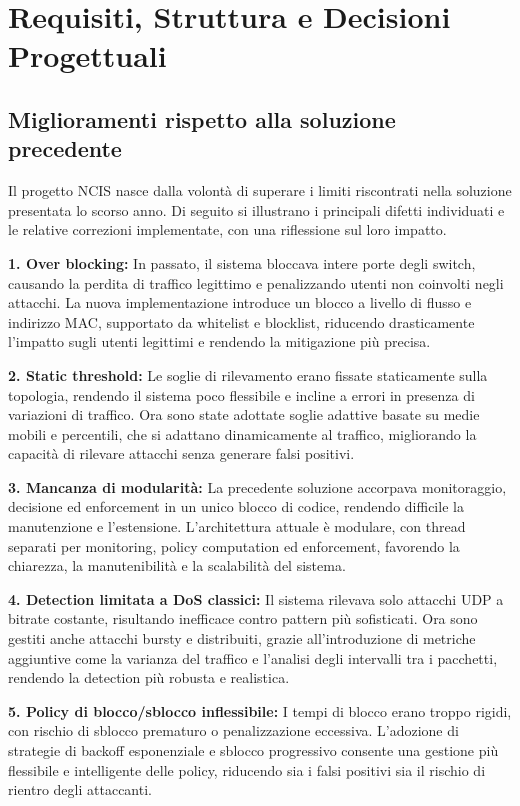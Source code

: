 \chapter{Requisiti, Struttura e Decisioni Progettuali}

\section{Miglioramenti rispetto alla soluzione precedente}
Il progetto NCIS nasce dalla volontà di superare i limiti riscontrati nella soluzione presentata lo scorso anno. Di seguito si illustrano i principali difetti individuati e le relative correzioni implementate, con una riflessione sul loro impatto.

\textbf{1. Over blocking:} In passato, il sistema bloccava intere porte degli switch, causando la perdita di traffico legittimo e penalizzando utenti non coinvolti negli attacchi. La nuova implementazione introduce un blocco a livello di flusso e indirizzo MAC, supportato da whitelist e blocklist, riducendo drasticamente l’impatto sugli utenti legittimi e rendendo la mitigazione più precisa.

\textbf{2. Static threshold:} Le soglie di rilevamento erano fissate staticamente sulla topologia, rendendo il sistema poco flessibile e incline a errori in presenza di variazioni di traffico. Ora sono state adottate soglie adattive basate su medie mobili e percentili, che si adattano dinamicamente al traffico, migliorando la capacità di rilevare attacchi senza generare falsi positivi.

\textbf{3. Mancanza di modularità:} La precedente soluzione accorpava monitoraggio, decisione ed enforcement in un unico blocco di codice, rendendo difficile la manutenzione e l’estensione. L’architettura attuale è modulare, con thread separati per monitoring, policy computation ed enforcement, favorendo la chiarezza, la manutenibilità e la scalabilità del sistema.

\textbf{4. Detection limitata a DoS classici:} Il sistema rilevava solo attacchi UDP a bitrate costante, risultando inefficace contro pattern più sofisticati. Ora sono gestiti anche attacchi bursty e distribuiti, grazie all’introduzione di metriche aggiuntive come la varianza del traffico e l’analisi degli intervalli tra i pacchetti, rendendo la detection più robusta e realistica.

\textbf{5. Policy di blocco/sblocco inflessibile:} I tempi di blocco erano troppo rigidi, con rischio di sblocco prematuro o penalizzazione eccessiva. L’adozione di strategie di backoff esponenziale e sblocco progressivo consente una gestione più flessibile e intelligente delle policy, riducendo sia i falsi positivi sia il rischio di rientro degli attaccanti.

